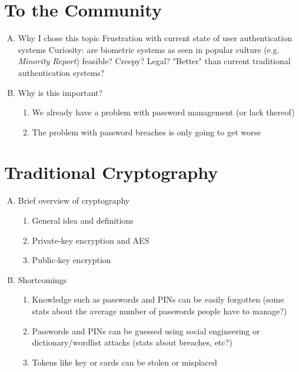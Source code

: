 \documentclass[11pt]{article}
\begin{document}
\section{To the Community}
    \begin{enumerate}[A.]
    \item Why I chose this topic
    Frustration with current state of user authentication systems
    Curiosity: are biometric systems as seen in popular culture (e.g. \textit{Minority Report}) feasible? Creepy? Legal? "Better" than current traditional authentication systems?
    \item Why is this important?
        \begin{enumerate}[1.]
        \item We already have a problem with password management (or lack thereof)
        \item The problem with password breaches is only going to get worse
        \end{enumerate}
    \end{enumerate}
\section{Traditional Cryptography}
    \begin{enumerate}[A.]
    \item Brief overview of cryptography
        \begin{enumerate}[1.]
        \item General idea and definitions
        \item Private-key encryption and AES
        \item Public-key encryption
        \end{enumerate}
    \item Shortcomings
        \begin{enumerate}[1.]
        \item Knowledge such as passwords and PINs can be easily forgotten (some stats about the average number of passwords people have to manage?)
        \item Passwords and PINs can be guessed using social engineering or dictionary/wordlist attacks (stats about breaches, etc?)
        \item Tokens like key or cards can be stolen or misplaced
        \end{enumerate}
    \end{enumerate}
\end{document}
